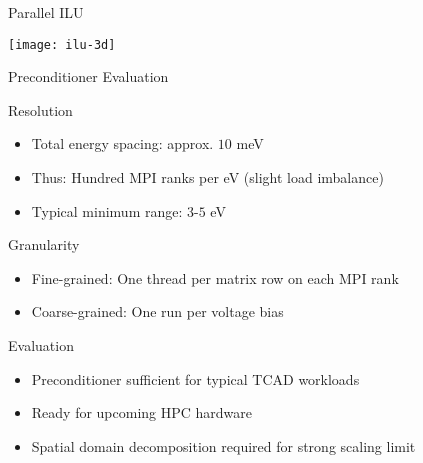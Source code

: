 \begin{frame}{Parallel ILU}

  \begin{center}
    \texttt{[image: ilu-3d]}
  \end{center}
\end{frame}


\begin{frame}{Preconditioner Evaluation}

  \begin{block}{Resolution}
   \begin{itemize}
    \item Total energy spacing: approx. $10$ meV 
    \item Thus: Hundred MPI ranks per eV (slight load imbalance)
    \item Typical minimum range: $3$-$5$ eV
   \end{itemize}
  \end{block}

  
  \begin{block}{Granularity}
   \begin{itemize}
    \item Fine-grained: One thread per matrix row on each MPI rank
    \item Coarse-grained: One run per voltage bias
   \end{itemize}
  \end{block}

  
  \begin{block}{Evaluation}
   \begin{itemize}
    \item Preconditioner sufficient for typical TCAD workloads
    \item Ready for upcoming HPC hardware
    \item Spatial domain decomposition required for strong scaling limit
   \end{itemize}
  \end{block}

\end{frame}

